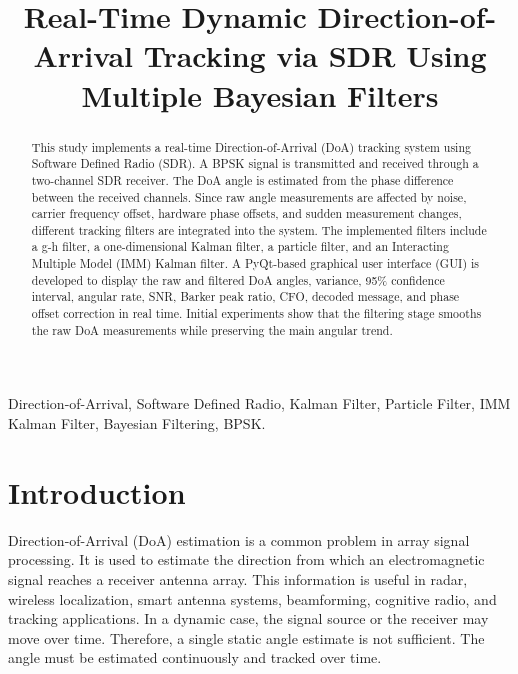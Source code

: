 \documentclass[conference]{IEEEtran}
\begin{document}
\title{Real-Time Dynamic Direction-of-Arrival Tracking via SDR Using Multiple Bayesian Filters}

\author{
}

\maketitle

\begin{abstract}
This study implements a real-time Direction-of-Arrival (DoA) tracking system using Software Defined Radio (SDR). A BPSK signal is transmitted and received through a two-channel SDR receiver. The DoA angle is estimated from the phase difference between the received channels. Since raw angle measurements are affected by noise, carrier frequency offset, hardware phase offsets, and sudden measurement changes, different tracking filters are integrated into the system. The implemented filters include a g-h filter, a one-dimensional Kalman filter, a particle filter, and an Interacting Multiple Model (IMM) Kalman filter. A PyQt-based graphical user interface (GUI) is developed to display the raw and filtered DoA angles, variance, 95\% confidence interval, angular rate, SNR, Barker peak ratio, CFO, decoded message, and phase offset correction in real time. Initial experiments show that the filtering stage smooths the raw DoA measurements while preserving the main angular trend.
\end{abstract}

\begin{IEEEkeywords}
Direction-of-Arrival, Software Defined Radio, Kalman Filter, Particle Filter, IMM Kalman Filter, Bayesian Filtering, BPSK.
\end{IEEEkeywords}

\section{Introduction}

Direction-of-Arrival (DoA) estimation is a common problem in array signal processing. It is used to estimate the direction from which an electromagnetic signal reaches a receiver antenna array. This information is useful in radar, wireless localization, smart antenna systems, beamforming, cognitive radio, and tracking applications. In a dynamic case, the signal source or the receiver may move over time. Therefore, a single static angle estimate is not sufficient. The angle must be estimated continuously and tracked over time.
\end{document}
